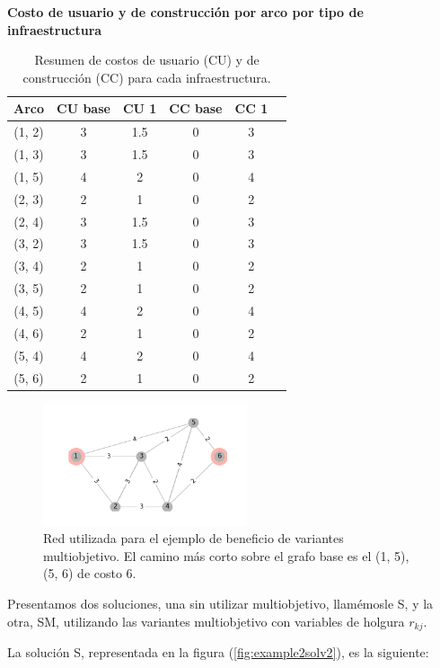 \documentclass{article}
\begin{document}
  \begin{table}[h!]
    \centering
      \caption*{{\bf Costo de usuario y de construcción por arco por tipo de infraestructura}}
    \begin{tabular}{cccccc}
      \toprule
      Arco & CU base & CU 1 & CC base & CC 1 & \\
      \midrule
        (1, 2) & 3 & 1.5 & 0 & 3 \\
        (1, 3) & 3 & 1.5 & 0 & 3 \\
        (1, 5) & 4 & 2   & 0 & 4 \\
        (2, 3) & 2 & 1   & 0 & 2 \\
        (2, 4) & 3 & 1.5 & 0 & 3 \\
        (3, 2) & 3 & 1.5 & 0 & 3 \\
        (3, 4) & 2 & 1   & 0 & 2 \\
        (3, 5) & 2 & 1   & 0 & 2 \\
        (4, 5) & 4 & 2   & 0 & 4 \\
        (4, 6) & 2 & 1   & 0 & 2 \\
        (5, 4) & 4 & 2   & 0 & 4 \\
        (5, 6) & 2 & 1   & 0 & 2 \\
      \bottomrule
    \end{tabular}
      \caption{Resumen de costos de usuario (CU) y de construcción (CC) para cada infraestructura.}\label{table:example2arccosts}
  \end{table}

  \begin{figure}[h!]
    \centering
    \includegraphics[width=6cm]{../resources/example_2_base.png}
      \caption{Red utilizada para el ejemplo de beneficio de variantes multiobjetivo. El camino más corto sobre el grafo base es el (1, 5), (5, 6) de costo 6.}
    \label{fig:example2base}
  \end{figure}

  Presentamos dos soluciones, una sin utilizar multiobjetivo, llamémosle S, y la otra, SM, utilizando las variantes multiobjetivo con variables de holgura $r_{kj}$.

  La solución S, representada en la figura (\ref{fig:example2solv2}), es la siguiente:
\end{document}
